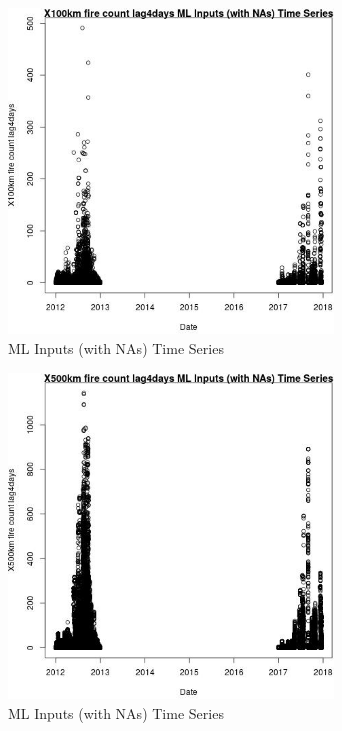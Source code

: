 \begin{figure} 
\centering  
\includegraphics[width=0.77\textwidth]{Code_Outputs/Report_ML_input_PM25_Step4_part_e_de_duplicated_aves_compiled_2019-05-14wNAs_X100km_fire_count_lag4daysvDate.jpg} 
\caption{\label{fig:Report_ML_input_PM25_Step4_part_e_de_duplicated_aves_compiled_2019-05-14wNAsX100km_fire_count_lag4daysvDate}ML Inputs (with NAs) Time Series} 
\end{figure} 
 

\begin{figure} 
\centering  
\includegraphics[width=0.77\textwidth]{Code_Outputs/Report_ML_input_PM25_Step4_part_e_de_duplicated_aves_compiled_2019-05-14wNAs_X500km_fire_count_lag4daysvDate.jpg} 
\caption{\label{fig:Report_ML_input_PM25_Step4_part_e_de_duplicated_aves_compiled_2019-05-14wNAsX500km_fire_count_lag4daysvDate}ML Inputs (with NAs) Time Series} 
\end{figure} 
 

